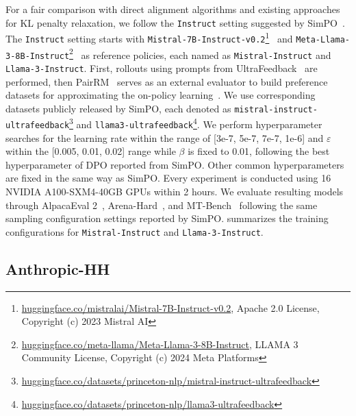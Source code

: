 For a fair comparison with direct alignment algorithms and existing approaches for KL penalty relaxation, we follow the \texttt{Instruct} setting suggested by SimPO~\cite{meng2024simpo}. The \texttt{Instruct} setting starts with \texttt{Mistral-7B-Instruct-v0.2}\footnote{\href{https://huggingface.co/mistralai/Mistral-7B-Instruct-v0.2}{huggingface.co/mistralai/Mistral-7B-Instruct-v0.2}, Apache 2.0 License, Copyright (c) 2023 Mistral AI}~\cite{jiang2023mistral} and \texttt{Meta-Llama-3-8B-Instruct}\footnote{\href{https://huggingface.co/meta-llama/Meta-Llama-3-8B-Instruct}{huggingface.co/meta-llama/Meta-Llama-3-8B-Instruct}, LLAMA 3 Community License, Copyright (c) 2024 Meta Platforms}~\cite{dubey2024llama} as reference policies, each named as \texttt{Mistral-Instruct} and \texttt{Llama-3-Instruct}. First, rollouts using prompts from UltraFeedback~\cite{cui2023ultrafeedback} are performed, then PairRM~\cite{jiang2023llm} serves as an external evaluator to build preference datasets for approximating the on-policy learning~\cite{tajwar2024preference, lee2024aligning}. We use corresponding datasets publicly released by SimPO, each denoted as \texttt{mistral-instruct-ultrafeedback}\footnote{\href{https://huggingface.co/datasets/princeton-nlp/mistral-instruct-ultrafeedback}{huggingface.co/datasets/princeton-nlp/mistral-instruct-ultrafeedback}} and \texttt{llama3-ultrafeedback}\footnote{\href{https://huggingface.co/datasets/princeton-nlp/llama3-ultrafeedback}{huggingface.co/datasets/princeton-nlp/llama3-ultrafeedback}}. We perform hyperparameter searches for the learning rate within the range of [3e-7, 5e-7, 7e-7, 1e-6] and  $\varepsilon$ within the [0.005, 0.01, 0.02] range while $\beta$ is fixed to 0.01, following the best hyperparameter of DPO reported from SimPO. Other common hyperparameters are fixed in the same way as SimPO. Every experiment is conducted using 16 NVIDIA A100-SXM4-40GB GPUs within 2 hours. We evaluate resulting models through AlpacaEval 2~\cite{dubois2024length}, Arena-Hard~\cite{li2024crowdsourced}, and MT-Bench~\cite{jiang2023llm} following the same sampling configuration settings reported by SimPO.  summarizes the training configurations for \texttt{Mistral-Instruct} and \texttt{Llama-3-Instruct}.



\subsection{Anthropic-HH}

